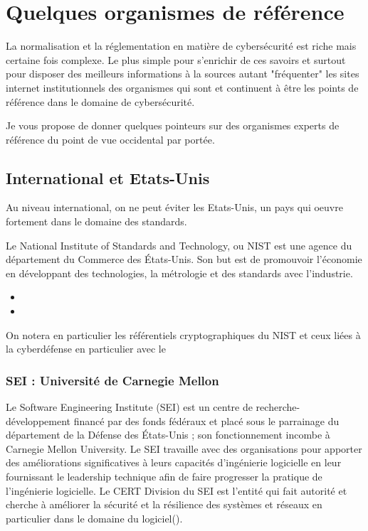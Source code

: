 \section{Quelques organismes de référence}

La normalisation et la réglementation en matière de cybersécurité est riche mais certaine fois complexe.
Le plus simple pour s'enrichir de ces savoirs et surtout pour disposer des meilleurs informations à la sources autant "fréquenter" les sites internet institutionnels des organismes qui sont et continuent à être les points de  référence dans le domaine de cybersécurité.

Je vous propose de donner quelques pointeurs sur des organismes experts  de référence du point de vue occidental par portée.

\subsection{International et Etats-Unis}

Au niveau international, on ne peut éviter les Etats-Unis, un pays qui oeuvre fortement dans le domaine des standards.

Le National Institute of Standards and Technology, ou NIST est une agence du département du Commerce des États-Unis. Son but est de promouvoir l'économie en développant des technologies, la métrologie et des standards avec l'industrie. 

\begin{itemize}
  \item {}
  \item {}
\end{itemize}

On notera en particulier les référentiels cryptographiques du NIST et ceux liées à la cyberdéfense en particulier avec le 

\subsubsection{SEI : Université de Carnegie Mellon}


Le Software Engineering Institute (SEI) est un centre de recherche-développement financé par des fonds fédéraux et placé sous le parrainage du département de la Défense des États-Unis ; son fonctionnement incombe à Carnegie Mellon University. Le SEI travaille avec des organisations pour apporter des améliorations significatives à leurs capacités d’ingénierie logicielle en leur fournissant le leadership technique afin de faire progresser la pratique de l’ingénierie logicielle. Le CERT Division du SEI est l’entité qui fait autorité et cherche à améliorer la sécurité et la résilience des systèmes et réseaux en particulier dans le domaine du logiciel().

